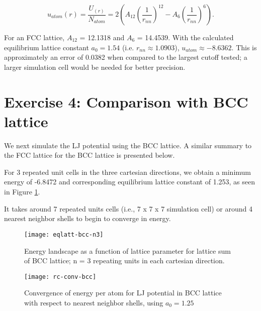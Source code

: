\documentclass[12pt, oneside]{article}
\begin{document}
\begin{equation} 
  u_{atom}(r) = \frac{U_(r)}{N_{atom}}= 2(A_{12}(\frac{1}{r_{nn}})^{12} - A_{6}(\frac{1}{r_{nn}})^6).
\end{equation} 

For an FCC lattice, $A_{12}$ = 12.1318 and $A_{6}$ = 14.4539. With the calculated equilibrium lattice constant $a_0 = 1.54 $ (i.e. $r_{nn} \approx 1.0903 $), $ u_{atom} \approx -8.6362 $. This is approximately an error of 0.0382 when compared to the largest cutoff tested; a larger simulation cell would be needed for better precision. 

\section{Exercise 4: Comparison with BCC lattice}

We next simulate the LJ potential using the BCC lattice. A similar summary to the FCC lattice for the BCC lattice is presented below. 

For 3 repeated unit cells in the three cartesian directions, we obtain a minimum energy of -6.8472 and corresponding equilibrium lattice constant of 1.253, as seen in Figure \ref{fig:eqlattbcc}.

It takes around 7 repeated units cells (i.e., 7 x 7 x 7 simulation cell) or around 4 nearest neighbor shells to begin to converge in energy.

\begin{figure}[h]
   \centering
   \texttt{[image: eqlatt-bcc-n3]} 
   \caption{Energy landscape as a function of lattice parameter for lattice sum of BCC lattice; n = 3 repeating units in each cartesian direction.}
   \label{fig:eqlattbcc}
\end{figure}

\begin{figure}[h]
   \centering
   \texttt{[image: rc-conv-bcc]} %
   \caption{Convergence of energy per atom for LJ potential in BCC lattice with respect to nearest neighbor shells, using $a_0 = 1.25$}
   \label{fig:rcsbcc}
\end{figure}
\end{document}
